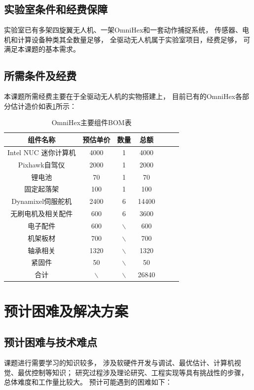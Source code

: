 \subsection{实验室条件和经费保障}
实验室已有多架四旋翼无人机、一架OmniHex和一套动作捕捉系统，
传感器、电机和计算设备种类其全数量足够，
全驱动无人机属于实验室项目，经费足够，
可满足本课题的基本需求。

\subsection{所需条件及经费}
本课题所需经费主要在于全驱动无人机的实物搭建上，
目前已有的OmniHex各部分估计造价如表\ref{tab:omni_hex_bom}所示：

\begin{table}[htbp]
    \caption{OmniHex主要组件BOM表\label{tab:omni_hex_bom}}
    \vspace{0.5em}\centering\wuhao
    \begin{tabular}{ccccccc}
    \toprule[1.5pt]
    组件名称 & 预估单价 & 数量 & 总额 \\
    \midrule[0.2pt]
    Intel NUC 迷你计算机 & 4000 & 1 & 4000 \\
    Pixhawk自驾仪 & 2000 & 1 & 2000 \\
    锂电池 & 70 & 1 & 70 \\ 
    固定起落架 & 100 & 1 & 100 \\ 
    Dynamixel伺服舵机 & 2400 & 6 & 14400 \\
    无刷电机及相关配件 & 600 & 6 & 3600 \\ 
    电子配件 & 600 & $\backslash$ & 600 \\
    机架板材 & 700 & $\backslash$ & 700 \\ 
    轴承相关 & 1320 & $\backslash$ & 1320 \\
    紧固件 & 50 & $\backslash$ & 50 \\ 
    合计 & $\backslash$ & $\backslash$ & 26840 \\
    \bottomrule[1.5pt]
    \end{tabular}
  \end{table}

\section{预计困难及解决方案}
\subsection{预计困难与技术难点}
课题进行需要学习的知识较多，
涉及软硬件开发与调试、最优估计、计算机视觉、最优控制等知识；
研究过程涉及理论研究、工程实现等具有挑战性的步骤，
总体难度和工作量比较大。
预计可能遇到的困难如下：

